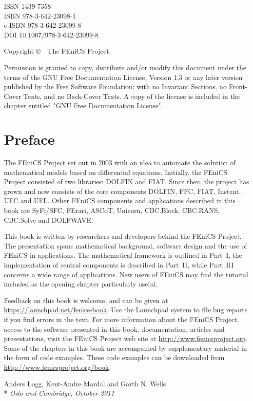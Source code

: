 \vfill

\noindent
ISSN 1439-7358 \\
ISBN 978-3-642-23098-1 \\
e-ISBN 978-3-642-23099-8 \\
DOI 10.1007/978-3-642-23099-8

\vspace{2ex}

\noindent
{\footnotesize Copyright \copyright\ \the\year\ The FEniCS Project.}

\vspace{2ex}

\noindent
{\footnotesize
Permission is granted to copy, distribute and/or modify this document
under the terms of the GNU Free Documentation License, Version 1.3 or
any later version published by the Free Software Foundation; with no
Invariant Sections, no Front-Cover Texts, and no Back-Cover Texts.  A
copy of the license is included in the chapter entitled "GNU Free
Documentation License".}

\tableofcontents

\chapter*{Preface}

\thispagestyle{empty}

The FEniCS Project set out in 2003 with an idea to automate the
solution of mathematical models based on differential equations.
Initially, the FEniCS Project consisted of two libraries: DOLFIN and
FIAT. Since then, the project has grown and now consists of the core
components DOLFIN, FFC, FIAT, Instant, UFC and UFL. Other FEniCS
components and applications described in this book are SyFi/SFC,
FErari, ASCoT, Unicorn, CBC.Block, CBC.RANS, CBC.Solve and DOLFWAVE.

This book is written by researchers and developers behind the FEniCS
Project. The presentation spans mathematical background, software
design and the use of FEniCS in applications. The mathematical
framework is outlined in Part~I, the implementation of central
components is described in Part~II, while Part~III concerns a wide
range of applications. New users of FEniCS may find the tutorial
included as the opening chapter particularly useful.

Feedback on this book is welcome, and can be given at
\url{https://launchpad.net/fenics-book}. Use the Launchpad system to
file bug reports if you find errors in the text. For more information
about the FEniCS Project, access to the software presented in this
book, documentation, articles and presentations, visit the FEniCS
Project web site at \url{http://www.fenicsproject.org}. Some of the
chapters in this book are accompanied by supplementary material in the
form of code examples. These code examples can be downloaded from
\url{http://www.fenicsproject.org/book}.

\vspace{1em}

\noindent
Anders Logg, Kent-Andre Mardal and Garth N. Wells \\*
\emph{Oslo and Cambridge, October 2011}
